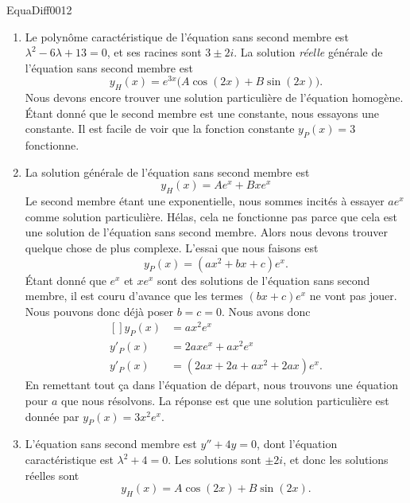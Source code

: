 \begin{corrige}{EquaDiff0012}
\begin{enumerate}
		\item
			Le polynôme caractéristique de l'équation sans second membre est $\lambda^2-6\lambda+13=0$, et ses racines sont $3\pm 2i$. La solution \emph{réelle} générale de l'équation sans second membre est 
			\begin{equation}
				y_H(x)= e^{3x}\big( A\cos(2x)+B\sin(2x) \big).
			\end{equation}
			Nous devons encore trouver une solution particulière de l'équation homogène. Étant donné que le second membre est une constante, nous essayons une constante. Il est facile de voir que la fonction constante $y_P(x)=3$ fonctionne.
		\item
			La solution générale de l'équation sans second membre est
			\begin{equation}
				y_H(x)=Ae^x+Bxe^x
			\end{equation}
			Le second membre étant une exponentielle, nous sommes incités à essayer $ae^{x}$ comme solution particulière. Hélas, cela ne fonctionne pas parce que cela est une solution de l'équation sans second membre. Alors nous devons trouver quelque chose de plus complexe. L'essai que nous faisons est
			\begin{equation}
				y_P(x)=(ax^2+bx+c) e^{x}.
			\end{equation}
			Étant donné que $ e^{x}$ et $x e^{x}$ sont des solutions de l'équation sans second membre, il est couru d'avance que les termes $(bx+c) e^{x}$ ne vont pas jouer. Nous pouvons donc déjà poser $b=c=0$. Nous avons donc
			\begin{equation}
				\begin{aligned}[]
					y_P(x)&=ax^2 e^{x}\\
					y'_P(x)&=2ax e^{x}+ax^2e^x\\
					y'_P(x)&=(2ax+2a+ax^2+2ax)e^x.
				\end{aligned}
			\end{equation}
			En remettant tout ça dans l'équation de départ, nous trouvons une équation pour $a$ que nous résolvons. La réponse est que une solution particulière est donnée par $y_P(x)=3x^2 e^{x}$.

		\item
			L'équation sans second membre est $y''+4y=0$, dont l'équation caractéristique est $\lambda^2+4=0$. Les solutions sont $\pm 2i$, et donc les solutions réelles sont
			\begin{equation}
				y_H(x)=A\cos(2x)+B\sin(2x).
			\end{equation}
			

\end{enumerate}
\end{corrige}
